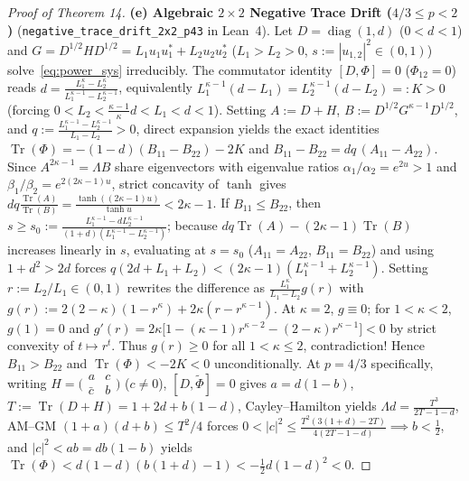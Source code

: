 \documentclass[10pt,letterpaper]{article}
\newcommand{\Tr}{\operatorname{Tr}}
\newcommand{\diag}{\operatorname{diag}}
\begin{document}
\begin{proof}[Proof of Theorem 14]
\textbf{(e) Algebraic $2\times 2$ Negative Trace Drift ($4/3 \le p < 2$)} (\texttt{negative\_trace\_drift\_2x2\_p43} in Lean~4).
Let $D = \diag(1, d)$ ($0 < d < 1$) and $G = D^{1/2} H D^{1/2} = L_1 u_1 u_1^* + L_2 u_2 u_2^*$ ($L_1 > L_2 > 0$, $s := |u_{1,2}|^2 \in (0, 1)$) solve~\eqref{eq:power_sys} irreducibly. The commutator identity $[D, \Phi] = 0$ ($\Phi_{12} = 0$) reads $d = \frac{L_1^\kappa - L_2^\kappa}{L_1^{\kappa-1} - L_2^{\kappa-1}}$, equivalently $L_1^{\kappa-1}(d - L_1) = L_2^{\kappa-1}(d - L_2) =: K > 0$ (forcing $0 < L_2 < \frac{\kappa-1}{\kappa} d < L_1 < d < 1$). Setting $A := D + H$, $B := D^{1/2} G^{\kappa-1} D^{1/2}$, and $q := \frac{L_1^{\kappa-1} - L_2^{\kappa-1}}{L_1 - L_2} > 0$, direct expansion yields the exact identities $\Tr(\Phi) = -(1-d)(B_{11} - B_{22}) - 2K$ and $B_{11} - B_{22} = d q\,(A_{11} - A_{22})$. Since $A^{2\kappa-1} = \Lambda B$ share eigenvectors with eigenvalue ratios $\alpha_1/\alpha_2 = e^{2u} > 1$ and $\beta_1/\beta_2 = e^{2(2\kappa-1)u}$, strict concavity of $\tanh$ gives $d q \frac{\Tr(A)}{\Tr(B)} = \frac{\tanh((2\kappa-1)u)}{\tanh u} < 2\kappa - 1$. If $B_{11} \le B_{22}$, then $s \ge s_0 := \frac{L_1^{\kappa-1} - d L_2^{\kappa-1}}{(1+d)(L_1^{\kappa-1}-L_2^{\kappa-1})}$; because $d q\Tr(A) - (2\kappa-1)\Tr(B)$ increases linearly in $s$, evaluating at $s = s_0$ ($A_{11} = A_{22}$, $B_{11} = B_{22}$) and using $1 + d^2 > 2d$ forces $q(2d + L_1 + L_2) < (2\kappa-1)(L_1^{\kappa-1} + L_2^{\kappa-1})$. Setting $r := L_2/L_1 \in (0, 1)$ rewrites the difference as $\frac{L_1^\kappa}{L_1 - L_2} g(r)$ with $g(r) := 2(2-\kappa)(1 - r^\kappa) + 2\kappa(r - r^{\kappa-1})$. At $\kappa = 2$, $g \equiv 0$; for $1 < \kappa < 2$, $g(1) = 0$ and $g'(r) = 2\kappa\bigl[1 - (\kappa-1)r^{\kappa-2} - (2-\kappa)r^{\kappa-1}\bigr] < 0$ by strict convexity of $t \mapsto r^t$. Thus $g(r) \ge 0$ for all $1 < \kappa \le 2$, contradiction! Hence $B_{11} > B_{22}$ and $\Tr(\Phi) < -2K < 0$ unconditionally. At $p = 4/3$ specifically, writing $H = \bigl(\begin{smallmatrix} a & c \\ \bar{c} & b \end{smallmatrix}\bigr)$ ($c \neq 0$), $[D, \widetilde{\Phi}] = 0$ gives $a = d(1-b)$, $T := \Tr(D+H) = 1 + 2d + b(1-d)$, Cayley--Hamilton yields $\Lambda d = \frac{T^3}{2T - 1 - d}$, AM--GM $(1+a)(d+b) \le T^2/4$ forces $0 < |c|^2 \le \frac{T^2(3(1+d)-2T)}{4(2T-1-d)} \implies b < \frac{1}{2}$, and $|c|^2 < ab = db(1-b)$ yields $\Tr(\Phi) < d(1-d)(b(1+d)-1) < -\frac{1}{2} d(1-d)^2 < 0$.
\end{proof}
\end{document}
